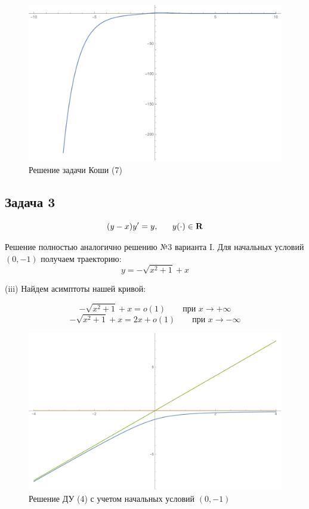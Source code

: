 \documentclass[a4paper, 12pt]{article}
\begin{document}
\begin{figure}[H]
	\centering
	\includegraphics[scale=0.7]{13}
	\caption{Решение задачи Коши (7)}
\end{figure}

		\subsection {Задача 3}
\begin{equation}
(y-x)y'=y, \;\;\;\;\;\;y(\cdot) \in \bf{R}
\end{equation}

Решение полностью аналогично решению №3 варианта I. Для начальных условий $(0, -1)$ получаем траекторию:
\[y = - \sqrt{x^2+1}+x\]


(iii) Найдем асимптоты  нашей кривой:

\[ -\sqrt{x^2+1}+x = o(1) \quad \quad \text{при $x \rightarrow + \infty$}\]
\[ -\sqrt{x^2+1}+x = 2x + o(1) \quad \quad \text{при $x \rightarrow - \infty$}\]

\begin{figure}[H]
	\centering
	\includegraphics[scale=0.6]{5}
	\caption{Решение ДУ (4) с учетом начальных условий $(0, -1)$}
\end{figure}
\end{document}
